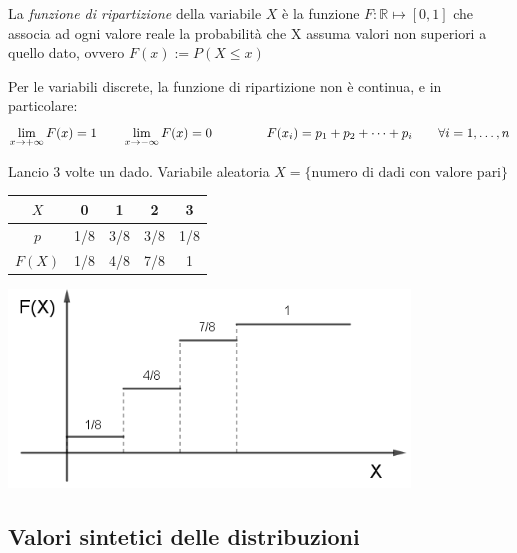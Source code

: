 \begin{definizione}
La \emph{funzione di ripartizione} della variabile \(X\) è la funzione \(F: \mathbb{R} \longmapsto [0,1]\) che associa ad ogni valore reale la probabilità che X assuma valori non superiori a quello dato, ovvero \(F(x) := P(X\leq x)\)
\end{definizione}

Per le variabili discrete, la funzione di ripartizione non è continua, e in particolare:
\[\lim_{x \rightarrow +\infty} F(x) = 1 \qquad \lim_{x \rightarrow -\infty} F(x) = 0 \hspace{1.5cm} F(x_i) = p_1+p_2+\dots+p_i  \qquad \forall i=1,\dots,n\]

\begin{esempio} Lancio 3 volte un dado. Variabile aleatoria \(X = \{ \text{numero di dadi con valore pari}\}\)\\

\begin{minipage}[c]{.45\textwidth}
\renewcommand\arraystretch{1.4}
\setlength\arraycolsep{25pt}
 \quad \begin{tabular}{c|c|c|c|c}
\(X\) & 0 & 1 & 2 & 3\\
\hline
\(p\) & 1/8 & 3/8 & 3/8 & 1/8\\
\hline
\(F(X)\) & 1/8 & 4/8 & 7/8 & 1\\
\end{tabular}
\end{minipage}\hfil
\begin{minipage}[c]{.55\textwidth}
\includegraphics[width=0.8\textwidth]{img/ripartizione.png}
\end{minipage}
\end{esempio}

\subsection{Valori sintetici delle distribuzioni}

